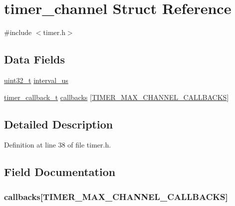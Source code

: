 \hypertarget{structtimer__channel}{\section{timer\-\_\-channel \-Struct \-Reference}
\label{structtimer__channel}
}


{\ttfamily \#include $<$timer.\-h$>$}

\subsection*{\-Data \-Fields}
\begin{DoxyCompactItemize}
\item 
\hyperlink{arch__types_8h_a435d1572bf3f880d55459d9805097f62}{uint32\-\_\-t} \hyperlink{structtimer__channel_ae6870555100e4900dd024291aa59bc64}{interval\-\_\-us}
\item 
\hyperlink{timer_8h_a1d134e8a1c43ace1df8be568acbdd90a}{timer\-\_\-callback\-\_\-t} \hyperlink{structtimer__channel_a216a7e5a54696bc7b473f0c6de919958}{callbacks} \mbox{[}\hyperlink{timer_8h_abeca3fcbfd18e8e9df6806b1061c67fe}{\-T\-I\-M\-E\-R\-\_\-\-M\-A\-X\-\_\-\-C\-H\-A\-N\-N\-E\-L\-\_\-\-C\-A\-L\-L\-B\-A\-C\-K\-S}\mbox{]}
\end{DoxyCompactItemize}


\subsection{\-Detailed \-Description}


\-Definition at line 38 of file timer.\-h.



\subsection{\-Field \-Documentation}
\hypertarget{structtimer__channel_a216a7e5a54696bc7b473f0c6de919958}{
\subsubsection[{callbacks}]{ {\bf callbacks}\mbox{[}{\bf \-T\-I\-M\-E\-R\-\_\-\-M\-A\-X\-\_\-\-C\-H\-A\-N\-N\-E\-L\-\_\-\-C\-A\-L\-L\-B\-A\-C\-K\-S}\mbox{]}}}\label{structtimer__channel_a216a7e5a54696bc7b473f0c6de919958}


